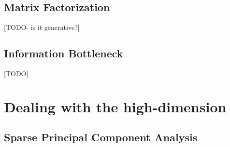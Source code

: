 \documentclass[12pt,a4paper]{article}
\begin{document}
\subsection{Matrix Factorization}
\label{sec:matrix_factorization}
[TODO- is it generative?]



\subsection{Information Bottleneck}
[TODO]

%
%
%


\begin{remark}
\end{remark}











\section{Dealing with the high-dimension}

\subsection{Sparse Principal Component Analysis}
\label{sec:sPCA}




\newpage


\end{document}
